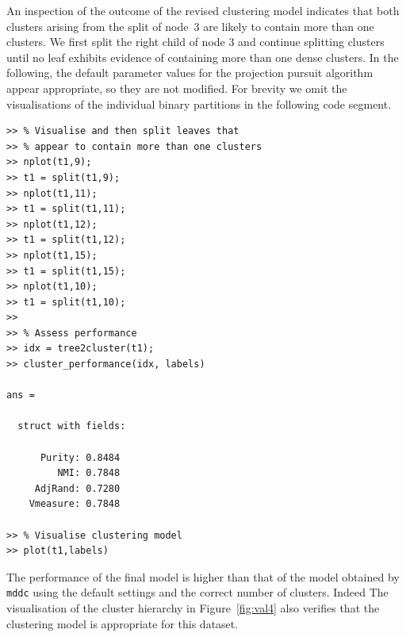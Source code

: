 \documentclass{book}
\begin{document}
An inspection of the outcome of the revised clustering model indicates
that both clusters arising from the split of node~3 are likely to contain
more than one clusters. We first split the right child of node 3 and continue
splitting clusters until no leaf exhibits evidence of containing more than 
one dense clusters. In the following, the default parameter values for the
projection pursuit algorithm appear appropriate, so they are not modified.
%
For brevity we omit the visualisations of the individual binary partitions
in the following code segment.

\begin{verbatim}
>> % Visualise and then split leaves that 
>> % appear to contain more than one clusters
>> nplot(t1,9);
>> t1 = split(t1,9);
>> nplot(t1,11);
>> t1 = split(t1,11);
>> nplot(t1,12);
>> t1 = split(t1,12);
>> nplot(t1,15);
>> t1 = split(t1,15);
>> nplot(t1,10);
>> t1 = split(t1,10);
>>
>> % Assess performance
>> idx = tree2cluster(t1);
>> cluster_performance(idx, labels)

ans = 

  struct with fields:

      Purity: 0.8484
         NMI: 0.7848
     AdjRand: 0.7280
    Vmeasure: 0.7848

>> % Visualise clustering model
>> plot(t1,labels)
\end{verbatim}


The performance of the final model is higher than that of the model obtained by
{\tt mddc} using the default settings and the correct number of clusters. Indeed
%
The visualisation of the cluster hierarchy in Figure~\ref{fig:val4}
also verifies that the clustering model is appropriate for this dataset.
\end{document}
